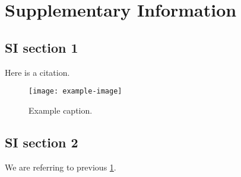 
\section{Supplementary Information}

\subsection{SI section 1}

Here is a citation. \citep{example}

\lipsum[1]{}

\begin{figure}[htb]
    \centering
    \texttt{[image: example-image]}
    \caption{%
        Example caption.
    }\label{fig:caption-si}
\end{figure}

\lipsum[5]{}

\subsection{SI section 2}

We are referring to previous \cref{fig:caption-si}.

\lipsum[5]{}
